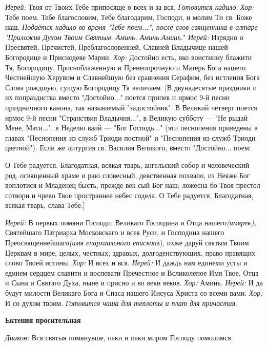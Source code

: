 {\itshape  Иерей:} Твоя от Твоих Тебе припосяще о всех и за вся. {\itshape  Готовится кадило}. 
{\itshape 
Хор:} Тебе поем. Тебе благословим, Тебе благодарим, Господи, и молим Ти ся. Боже наш. {\itshape  Подаётся кадило во время "Тебе поем...", после слов священника в алтаре "Приложив Духом Твоим Святым. Аминь. Аминь.Аминь.}"  
{\itshape 
  Иерей:} Изрядно о Пресвятей, Пречистей, Преблагословенней, Славней Владычице нашей Богородице и Приснодеве Марии. 
{\itshape 
Хор:} Достойно есть, яко воистинну блажити Тя, Богородицу, Присноблаженную и Пренепорочную и Матерь Бога нашего. Честнейшую Херувим и Славнейшую без сравнения Серафим, без истления Бога Слова рождшую, сущую Богородицу Тя величаем. 
 [В двунадесятые праздники и их попразднства вместо "Достойно..." поется припев и ирмос 9-й песни праздничного канона, так называемый "задостойник". В Великий четверг поется ирмос 9-й песни "Странствия Владычня...", в Великую субботу — "Не рыдай Мене, Мати...", в Неделю ваий — "Бог Господь..." (эти песнопения приведены в главах "Песнопения из служб Триоди постной" и "Песнопения из служб Триоди цветной").
 Если же литургия св. Василия Великого, вместо "Достойно... поем: 

      О Тебе радуется. Благодатная, всякая тварь, ангельский собор и человеческий род, освященный храме и раю словесный, девственная похвало, из Неяже Бог воплотися и Младенец бысть, прежде век сый Бог наш; ложесна бо Твоя престол сотвори и чрево Твое пространнее небес содела. О Тебе радуется, Благодатная, всякая тварь, слава Тебе.]

{\itshape  Иерей:} В первых помяни Господи, Великаго Господина и Отца нашего{\itshape  (имярек),} Святейшаго Патриарха Московскаго и всея Руси, и Господина нашего Преосвященнейшаго{\itshape  (имя епархиального епископ}а), ихже даруй святым Твоим Церквам в мире, целых, честных, здравых, долгоденствующих, право правящих слово Твоей истины. {\itshape  Хор:} И всех и вся. {\itshape  Иерей:} И даждь нам единеми усты и единем сердцем славити и воспевати Пречестно{\itshape е} и Всликолепое Имя Твое, Отца и Сына и Святаго Духа, ныне и присно и во веки веков. 
{\itshape  
  Хор:} Аминь. {\itshape  Иерей:} И да будут милости Великаго Бога и Спаса нашего Иисуса Христа со всеми вами. 
{\itshape 
  Хор:} И со духом твоим. {\itshape  Готовится чаша для теплоты и плат для причастия}. 

 {\bfseries  Ектения просительная } 

{\itshape  Диакон:} Вся святыя помянувше, паки и паки миром Господу помолимся. 


